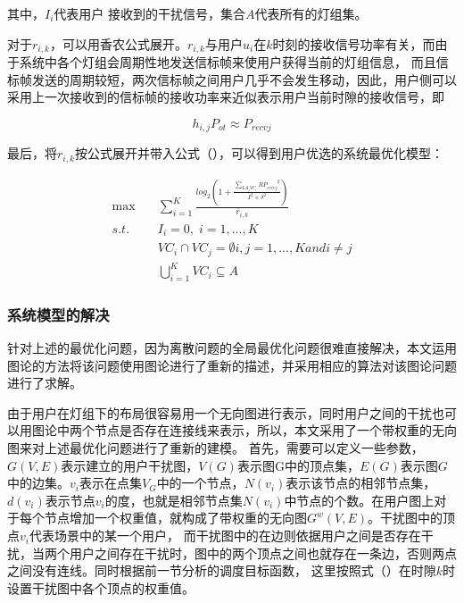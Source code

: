 其中，$I_{i}$代表用户 接收到的干扰信号，集合$A$代表所有的灯组集。

对于$r_{i,k}$，可以用香农公式展开。$r_{i,k}$与用户$u_{i}$在$k$时刻的接收信号功率有关，而由于系统中各个灯组会周期性地发送信标帧来使用户获得当前的灯组信息，
而且信标帧发送的周期较短，两次信标帧之间用户几乎不会发生移动，因此，用户侧可以采用上一次接收到的信标帧的接收功率来近似表示用户当前时隙的接收信号，即

\begin{equation}
    {h_{i,j}}{P_{ot}} \approx {P_{recvj}}
\end{equation}

最后，将$r_{i,k}$按公式展开并带入公式（），可以得到用户优选的系统最优化模型：

\begin{equation}
\begin{aligned}
    \max\quad & \sum_{i=1}^{K}\frac{log_{2}(1+\frac{{\sum_{LA_{j} VC_{i}}RP_{recvj}}^2}{I^2+\delta^2})}{\overline{r}_{i,k}} \\
    s.t.\quad & I_{i} = 0,\; i=1,...,K \\
        & VC_{i} \cap VC_{j} = \emptyset  i,j= 1,...,K and i \ne j  \\
        & \bigcup_{i = 1}^K V{C_i} \subseteq A
\end{aligned}
\end{equation}

\subsubsection{系统模型的解决}
针对上述的最优化问题，因为离散问题的全局最优化问题很难直接解决，本文运用图论的方法将该问题使用图论进行了重新的描述，并采用相应的算法对该图论问题进行了求解。

由于用户在灯组下的布局很容易用一个无向图进行表示，同时用户之间的干扰也可以用图论中两个节点是否存在连接线来表示，所以，本文采用了一个带权重的无向图来对上述最优化问题进行了重新的建模。
首先，需要可以定义一些参数，$G(V,E)$表示建立的用户干扰图，$V(G)$表示图G中的顶点集，$E(G)$表示图$G$中的边集。$v_{i}$表示在点集$V_{G}$中的一个节点，$N(v_{i})$表示该节点的相邻节点集，
$d(v_{i})$表示节点$v_{i}$的度，也就是相邻节点集$N(v_{i})$中节点的个数。在用户图上对于每个节点增加一个权重值，就构成了带权重的无向图$G^{w}(V,E)$。干扰图中的顶点$v_{i}$代表场景中的某一个用户，
而干扰图中的在边则依据用户之间是否存在干扰，当两个用户之间存在干扰时，图中的两个顶点之间也就存在一条边，否则两点之间没有连线。同时根据前一节分析的调度目标函数，
这里按照式（）在时隙$k$时设置干扰图中各个顶点的权重值。

